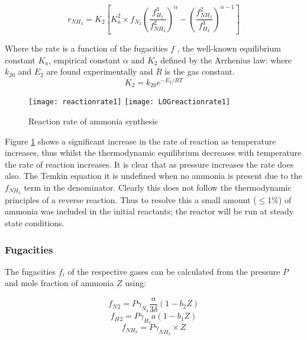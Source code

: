 \begin{equation}
\label{eq:GuiB}
r_{NH_3} = K_2 \left [ K_a^2 \times f_{N_2}
\left ( \frac{f_{H_2}^3}{f_{NH_3}^2} \right ) ^\alpha - \left ( \frac{f_{NH_3}^2}{f_{H_2}^3} \right ) ^{\alpha - 1}
\right ]
\end{equation}

Where the rate is a function of the fugacities $f$ , the well-known equilibrium constant $K_a$, empirical constant $\alpha$  and  $K_2$ defined by the Arrhenius law: where $k_20$ and $E_2$ are found experimentally and $R$ is the gas constant.
\begin{equation}
\label{eq:Arr}
	K_2 = k_{20}e^{-E_2/RT}
\end{equation}

{\begin{figure}[h]
		\centering
		{\centering	
		\texttt{[image: reactionrate1]}
		\texttt{[image: LOGreactionrate1]}	
		\caption{Reaction rate of ammonia synthesis \label{fig:rateGraph}}
		}

\end{figure}}


Figure \ref{fig:rateGraph} shows a significant increase in the rate of reaction as temperature increases, thus whilst the thermodynamic equilibrium decreases with temperature the rate of reaction increases. It is clear that as pressure increases the rate does also. The Temkin equation it is undefined when no ammonia is present due to the $f_{NH_3}$ term in the denominator. Clearly this does not follow the thermodynamic principles of a reverse reaction. Thus to resolve this a small amount ($\leq$1\%) of ammonia was included in the initial reactants; the reactor will be run at steady state conditions.

\subsubsection{Fugacities}
The fugacities $f_i$ of the respective gases can be calculated from the pressure $P$ and mole fraction of ammonia $Z$ using:

{\singlespacing
\begin{equation}
f_N{_2}= P\gamma_{N_2}\frac{a}{3\delta}(1-b_2Z)
\end{equation}
\begin{equation}
f_H{_2}=P\gamma_{H_2}a(1-b_1Z) 
\end{equation}
\begin{equation}
f_{NH{_3}}=P\gamma_{NH_3}\times Z 
\end{equation}}


